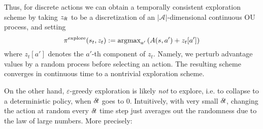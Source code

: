 Thus, for discrete actions we can obtain a temporally consistent
exploration scheme by taking
$z_{\delta\hspace{-.1em}t}$ to be a discretization of an $|\mathcal{A}|$-dimensional
continuous OU process, and setting
\begin{equation}
  \pi^\text{explore}(s_t, z_t)\mathrel{\mathop{:}}= \text{argmax}_{a'} \left(A(s, a') + z_t[a']\right)
\end{equation}
where $z_t[a']$ denotes the $a'$-th component of $z_t$. Namely, we
perturb advantage values by a random process before selecting an action. The resulting scheme
converges in continuous time to a nontrivial exploration scheme.

On the other hand,
$\varepsilon$-greedy
exploration is likely \emph{not} to explore, i.e. to collapse to a deterministic
policy, when ${\delta\hspace{-.1em}t}$ goes to $0$.
Intuitively,
with very small ${\delta\hspace{-.1em}t}$, changing the action at random every ${\delta\hspace{-.1em}t}$ time
step just averages out the randomness due to the law of large numbers.
More precisely:%



